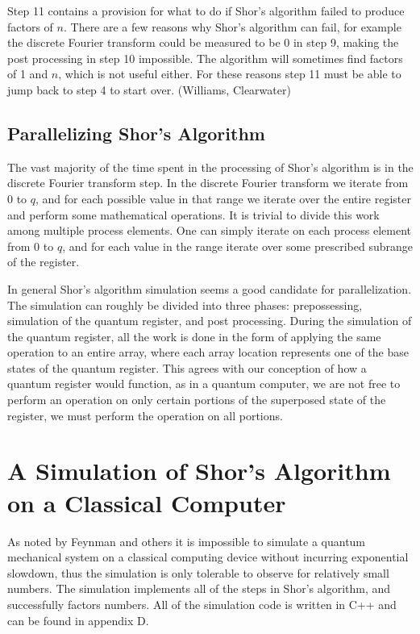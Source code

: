 \documentclass[]{article}
\begin{document}
Step 11 contains a provision for what to do if Shor's algorithm failed
to produce factors of $n$.  There are a few reasons why Shor's
algorithm can fail, for example the discrete Fourier transform could
be measured to be 0 in step 9, making the post processing in step 10
impossible.  The algorithm will sometimes find factors of 1 and $n$,
which is not useful either.  For these reasons step 11 must be able to
jump back to step 4 to start over.  (Williams, Clearwater)

\subsection{Parallelizing Shor's Algorithm}

The vast majority of the time spent in the processing of Shor's
algorithm is in the discrete Fourier transform step.  In the discrete
Fourier transform we iterate from 0 to $q$, and for each possible
value in that range we iterate over the entire register and perform
some mathematical operations.  It is trivial to divide this work among
multiple process elements.  One can simply iterate on each process
element from 0 to $q$, and for each value in the range iterate over
some prescribed subrange of the register.

In general Shor's algorithm simulation seems a good candidate for
parallelization.  The simulation can roughly be divided into three
phases: prepossessing, simulation of the quantum register, and post
processing.  During the simulation of the quantum register, all the
work is done in the form of applying the same operation to an entire
array, where each array location represents one of the base states of
the quantum register.  This agrees with our conception of how a
quantum register would function, as in a quantum computer, we are not
free to perform an operation on only certain portions of the
superposed state of the register, we must perform the operation on all
portions.

\section{A Simulation of Shor's Algorithm on a Classical Computer}

As noted by Feynman and others it is impossible to simulate a quantum
mechanical system on a classical computing device without incurring
exponential slowdown, thus the simulation is only tolerable to observe
for relatively small numbers. The simulation implements all of the
steps in Shor's algorithm, and successfully factors numbers. All of
the simulation code is written in C++ and can be found in appendix D.
\end{document}

